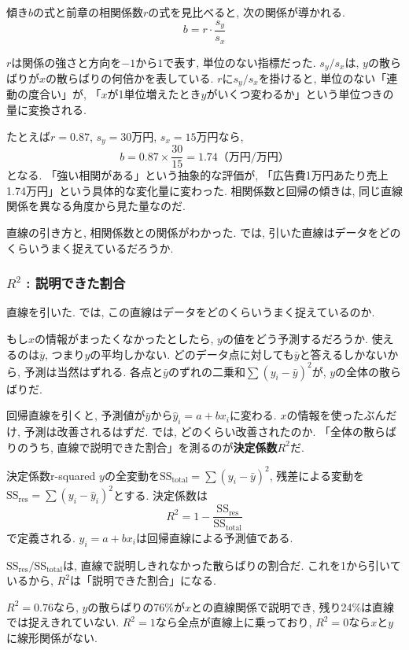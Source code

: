 傾き$b$の式と前章の相関係数$r$の式を見比べると, 次の関係が導かれる.
\[
  b = r \cdot \frac{s_y}{s_x}
\]

$r$は関係の強さと方向を$-1$から$1$で表す, 単位のない指標だった.
$s_y / s_x$は, $y$の散らばりが$x$の散らばりの何倍かを表している.
$r$に$s_y / s_x$を掛けると, 単位のない「連動の度合い」が, 「$x$が1単位増えたとき$y$がいくつ変わるか」という単位つきの量に変換される.

たとえば$r = 0.87$, $s_y = 30$万円, $s_x = 15$万円なら,
\[
  b = 0.87 \times \frac{30}{15} = 1.74 \text{（万円/万円）}
\]
となる.
「強い相関がある」という抽象的な評価が, 「広告費1万円あたり売上1.74万円」という具体的な変化量に変わった.
相関係数と回帰の傾きは, 同じ直線関係を異なる角度から見た量なのだ.

直線の引き方と, 相関係数との関係がわかった.
では, 引いた直線はデータをどのくらいうまく捉えているだろうか.

\subsubsection*{$R^2$ : 説明できた割合}

直線を引いた.
では, この直線はデータをどのくらいうまく捉えているのか.

もし$x$の情報がまったくなかったとしたら, $y$の値をどう予測するだろうか.
使えるのは$\bar{y}$, つまり$y$の平均しかない.
どのデータ点に対しても$\bar{y}$と答えるしかないから, 予測は当然はずれる.
各点と$\bar{y}$のずれの二乗和$\sum(y_i - \bar{y})^2$が, $y$の全体の散らばりだ.

回帰直線を引くと, 予測値が$\bar{y}$から$\hat{y}_i = a + bx_i$に変わる.
$x$の情報を使ったぶんだけ, 予測は改善されるはずだ.
では, どのくらい改善されたのか.
「全体の散らばりのうち, 直線で説明できた割合」を測るのが\textbf{決定係数}$R^2$だ.

\begin{defi}{決定係数}{r-squared}
$y$の全変動を$\mathrm{SS_{total}} = \sum(y_i - \bar{y})^2$, 残差による変動を$\mathrm{SS_{res}} = \sum(y_i - \hat{y}_i)^2$とする.
決定係数は
\[
  R^2 = 1 - \frac{\mathrm{SS_{res}}}{\mathrm{SS_{total}}}
\]
で定義される. $\hat{y}_i = a + bx_i$は回帰直線による予測値である.
\end{defi}

$\mathrm{SS_{res}} / \mathrm{SS_{total}}$は, 直線で説明しきれなかった散らばりの割合だ.
これを1から引いているから, $R^2$は「説明できた割合」になる.

$R^2 = 0.76$なら, $y$の散らばりの76\%が$x$との直線関係で説明でき, 残り24\%は直線では捉えきれていない.
$R^2 = 1$なら全点が直線上に乗っており, $R^2 = 0$なら$x$と$y$に線形関係がない.

